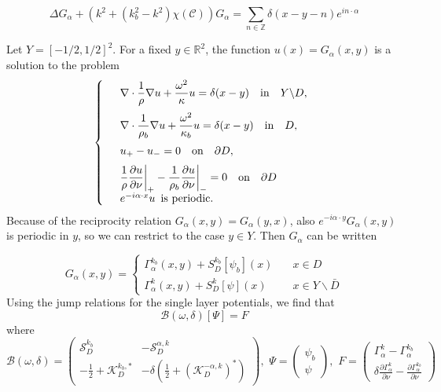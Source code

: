 \documentclass[a4paper]{article}
\theoremstyle{definition}
\newcommand{\Z}{\mathbb{Z}}
\newcommand{\R}{\mathbb{R}}
\newcommand{\C}{\mathcal{C}}
\newcommand{\B}{\mathcal{B}}
\newcommand{\ds}{\displaystyle}
\def\nm{\noalign{\medskip}}
\begin{document}
\begin{equation*}
\Delta G_\alpha + (k^2+(k_b^2-k^2)\chi(\C))G_\alpha = \sum_{n\in \Z} \delta(x-y-n)e^{in\cdot\alpha}
\end{equation*}

Let $Y= [-1/2,1/2]^2$. For a fixed $y\in \R^2$, the function $u(x)=G_\alpha(x,y)$ is a solution to the problem
\begin{equation} \label{eq:quasiperiodic}
\left\{
\begin{array} {ll}
&\ds \nabla \cdot \frac{1}{\rho} \nabla  u+ \frac{\omega^2}{\kappa} u  = \delta(x-y) \quad \text{in} \quad Y \backslash D, \\
\nm
&\ds \nabla \cdot \frac{1}{\rho_b} \nabla  u+ \frac{\omega^2}{\kappa_b} u  = \delta(x-y) \quad \text{in} \quad D, \\
\nm
&\ds  u_{+} -u_{-}  =0   \quad \text{on} \quad \partial D, \\
\nm
& \ds  \frac{1}{\rho} \frac{\partial u}{\partial \nu} \bigg|_{+} - \frac{1}{\rho_b} \frac{\partial u}{\partial \nu} \bigg|_{-} =0 \quad \text{on} \quad \partial D \\
&  e^{-i \alpha \cdot x} u  \,\,\,  \text{is periodic.}
\end{array}
\right.
\end{equation}
Because of the reciprocity relation $G_\alpha(x,y) = G_\alpha(y,x)$, also $e^{-i \alpha \cdot y} G_\alpha(x,y)$ is periodic in $y$, so we can restrict to the case $y\in Y$. 
Then $G_\alpha$ can be written

\begin{equation*}
G_\alpha(x,y) = \begin{cases} \Gamma_\alpha^{k_b}(x,y) + S_D^{k_b}[\psi_b](x) \quad &x\in D \\  \Gamma_\alpha^{k}(x,y) + S_D^{k}[\psi](x) &x\in Y \backslash \bar{D} \end{cases}
\end{equation*}
Using the jump relations for the single layer potentials, we find that
\begin{equation*}
\B(\omega,\delta)[\Psi] = F
\end{equation*}
where 
\begin{equation*}
\B(\omega, \delta) = 
\begin{pmatrix}
\mathcal{S}_D^{k_b} &  -\mathcal{S}_D^{\alpha,k}  \\
-\frac{1}{2}+ \mathcal{K}_D^{k_b, *}& -\delta( \frac{1}{2}+ (\mathcal{K}_D^{ -\alpha,k})^*)
\end{pmatrix}, 
\,\, \Psi= 
\begin{pmatrix}
\psi_b\\
\psi
\end{pmatrix},
\,\, F=
\begin{pmatrix}
\Gamma_\alpha^{k} - \Gamma_\alpha^{k_b} \\
\delta\frac{\partial \Gamma_\alpha^{k}}{\partial \nu} -
\frac{\partial \Gamma_\alpha^{k_b}}{\partial \nu} 
\end{pmatrix}
\end{equation*}
\end{document}
